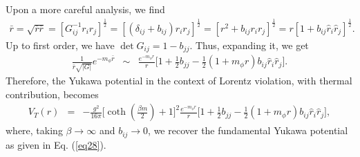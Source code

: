 \documentclass[11pt,showpacs,preprintnumbers,amsmath,amssymb,prd,nofootinbib,superscriptaddress]{revtex4-2}
\begin{document}
Upon a more careful analysis, we find
\begin{eqnarray}
    \bar{r}=\sqrt{\bar{r}\bar{r}}=\left[G_{ij}^{-1}r_ir_j\right]^{\frac{1}{2}}=\left[\left(\delta_{ij}+b_{ij}\right)r_ir_j\right]^{\frac{1}{2}}=\left[r^2+b_{ij}r_ir_j\right]^{\frac{1}{2}}=r\left[1+b_{ij}\hat{r}_i\hat{r}_j\right]^{\frac{1}{2}}.
\end{eqnarray}
Up to first order, we have $\det{G_{ij}} = 1 - b_{jj}$. Thus, expanding it, we get
\begin{eqnarray}
    \frac{1}{\bar{r}\sqrt{|G|}}e^{-m_\phi\bar{r}}&\sim&%
    \frac{e^{-m_\phi r}}{r}\biggl[1+\frac{1}{2}b_{jj}-\frac{1}{2}(1+m_\phi r)b_{ij}\hat{r}_i\hat{r}_j\biggr].
\end{eqnarray}
Therefore, the Yukawa potential in the context of Lorentz violation, with thermal contribution,  becomes
\begin{eqnarray}
    V_T(r)
    &=&-\frac{g^2}{16\pi}\biggr[\coth{\left(\frac{\beta m}{2}\right)}+1\biggl]^2\frac{e^{-m_\phi r}}{r}\biggl[1+\frac{1}{2}b_{jj}-\frac{1}{2}(1+m_\phi r)b_{ij}\hat{r}_i\hat{r}_j\biggr],\label{eq19}
\end{eqnarray}
where, taking $\beta \to \infty$ and $b_{ij} \to 0$, we recover the fundamental Yukawa potential as given in Eq. (\ref{eq28})\textcolor{red}{\cite{peskin}}.
\end{document}
